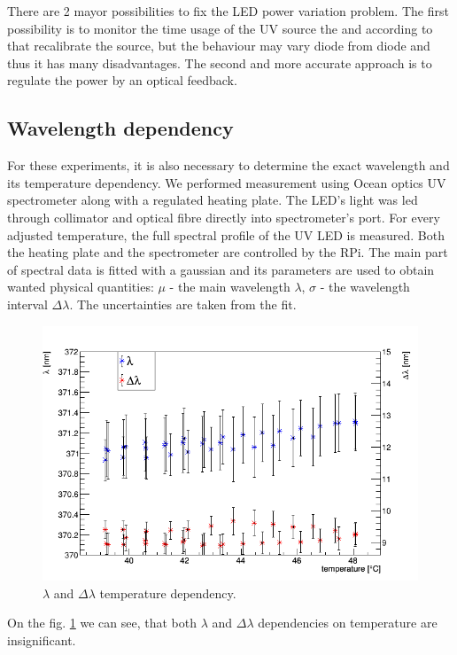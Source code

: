 \par
There are 2 mayor possibilities to fix the LED power variation problem. The first possibility is to monitor the time usage of the UV source the and according to that recalibrate the source, but the behaviour may vary diode from diode and thus it has many disadvantages. The second and more accurate approach is to regulate the power by an optical feedback.    


\subsection{Wavelength dependency}

For these experiments, it is also necessary to determine the exact wavelength and its temperature dependency. We performed measurement using Ocean optics UV spectrometer along with a regulated heating plate. The LED's light was led through collimator and optical fibre directly into spectrometer's port. For every adjusted temperature, the full spectral profile of the UV LED is measured. Both the heating plate and the spectrometer are controlled by the RPi. The main part of spectral data is fitted with a gaussian and its parameters are used to obtain wanted physical quantities: $\mu$ - the main wavelength $\lambda$, $\sigma$ - the wavelength interval $\Delta \lambda$. The uncertainties are taken from the fit.


\begin{figure}[H]
 \centering
 \includegraphics[scale=0.5]{./pictures/SpectreShakeWave}
 \caption{$\lambda$ and $\Delta \lambda$ temperature dependency.}
 \label{wavdep}
\end{figure}

On the fig. \ref{wavdep} we can see, that both $\lambda$ and $\Delta \lambda$ dependencies on temperature are insignificant.

